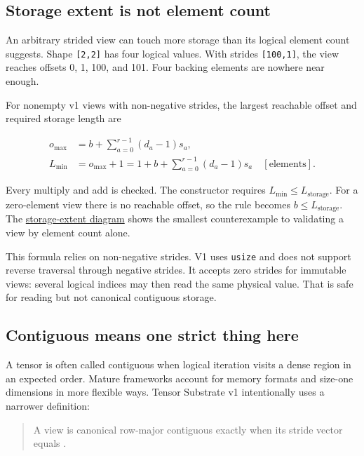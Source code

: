 \documentclass[
  10pt,
]{article}
\newcounter{none} %
\begin{document}
\subsection{Storage extent is not element
count}\label{storage-extent-is-not-element-count}

An arbitrary strided view can touch more storage than its logical
element count suggests. Shape \texttt{{[}2,2{]}} has four logical
values. With strides \texttt{{[}100,1{]}}, the view reaches offsets 0,
1, 100, and 101. Four backing elements are nowhere near enough.

For nonempty v1 views with non-negative strides, the largest reachable
offset and required storage length are

\[
\begin{aligned}
o_{\max}&=b+\sum_{a=0}^{r-1}(d_a-1)s_a,\\
L_{\min}&=o_{\max}+1
=1+b+\sum_{a=0}^{r-1}(d_a-1)s_a
\quad[\mathrm{elements}].
\end{aligned}
\]

Every multiply and add is checked. The constructor requires
\(L_{\min}\le L_{\text{storage}}\). For a zero-element view there is no
reachable offset, so the rule becomes \(b\le L_{\text{storage}}\). The
\href{https://github.com/hermonai/inside-the-llm-engine/blob/astra-visual-rewrite/diagrams/tensor/storage-extent.txt}{storage-extent
diagram} shows the smallest counterexample to validating a view by
element count alone.

This formula relies on non-negative strides. V1 uses \texttt{usize} and
does not support reverse traversal through negative strides. It accepts
zero strides for immutable views: several logical indices may then read
the same physical value. That is safe for reading but not canonical
contiguous storage.

\subsection{Contiguous means one strict thing
here}\label{contiguous-means-one-strict-thing-here}

A tensor is often called contiguous when logical iteration visits a
dense region in an expected order. Mature frameworks account for memory
formats and size-one dimensions in more flexible ways. Tensor Substrate
v1 intentionally uses a narrower definition:

\begin{quote}
A view is canonical row-major contiguous exactly when its stride vector
equals \texttt{}.
\end{quote}
\end{document}
